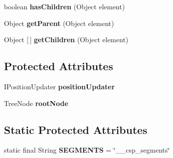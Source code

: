 \begin{DoxyCompactItemize}
boolean {\bfseries has\+Children} (Object element)
\item 
\mbox{\label{classcom_1_1fware_1_1cspdt_1_1cspm_1_1editor_1_1outline_1_1_csp_m_outline_content_provider_a91364f3be9adb73d632450b9f3411925}} 
Object {\bfseries get\+Parent} (Object element)
\item 
\mbox{\label{classcom_1_1fware_1_1cspdt_1_1cspm_1_1editor_1_1outline_1_1_csp_m_outline_content_provider_ae355ce14693f49850ad590fcd290e540}} 
Object \mbox{[}$\,$\mbox{]} {\bfseries get\+Children} (Object element)
\end{DoxyCompactItemize}
\subsection*{Protected Attributes}
\begin{DoxyCompactItemize}
\item 
\mbox{\label{classcom_1_1fware_1_1cspdt_1_1cspm_1_1editor_1_1outline_1_1_csp_m_outline_content_provider_a1528f27271bb833b969a29939aa1a272}} 
I\+Position\+Updater {\bfseries position\+Updater}
\item 
\mbox{\label{classcom_1_1fware_1_1cspdt_1_1cspm_1_1editor_1_1outline_1_1_csp_m_outline_content_provider_af30280dee60b8750b67ecf03505d30b4}} 
Tree\+Node {\bfseries root\+Node}
\end{DoxyCompactItemize}
\subsection*{Static Protected Attributes}
\begin{DoxyCompactItemize}
\item 
\mbox{\label{classcom_1_1fware_1_1cspdt_1_1cspm_1_1editor_1_1outline_1_1_csp_m_outline_content_provider_a32c1de6fd7411d0d03effa8d0bd56eef}} 
static final String {\bfseries S\+E\+G\+M\+E\+N\+TS} = \char`\"{}\+\_\+\+\_\+csp\+\_\+segments\char`\"{}
\end{DoxyCompactItemize}


